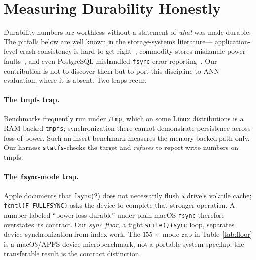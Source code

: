 \documentclass[sigconf,nonacm,balance=false]{acmart}
\newcommand{\fsync}{\texttt{fsync}}
\begin{document}
\section{Measuring Durability Honestly}
\label{sec:honest}
Durability numbers are worthless without a statement of \emph{what} was made
durable. The pitfalls below are well known in the storage-systems literature---
application-level crash-consistency is hard to get right~\cite{pillai}, commodity
stores mishandle power faults~\cite{torturing}, and even PostgreSQL mishandled
\fsync{} error reporting~\cite{fsyncgate}. Our contribution is not to discover them
but to port this discipline to ANN evaluation, where it is absent. Two traps recur.

\paragraph{The tmpfs trap.} Benchmarks frequently run under \texttt{/tmp}, which
on some Linux distributions is a RAM-backed \texttt{tmpfs}; synchronization there
cannot demonstrate persistence across loss of power. Such an insert benchmark
measures the memory-backed path only. Our
harness \texttt{statfs}-checks the target and \emph{refuses} to report write
numbers on tmpfs.

\paragraph{The \fsync{}-mode trap.} Apple documents that \texttt{fsync}(2) does
not necessarily flush a drive's volatile cache; \texttt{fcntl(F\_FULLFSYNC)} asks
the device to complete that stronger operation. A number labeled
``power-loss durable'' under plain macOS \fsync{} therefore overstates its
contract. Our \emph{sync floor}, a tight \texttt{write()+sync} loop, separates
device synchronization from index work. The $155\times$ mode gap in
Table~\ref{tab:floor} is a macOS/APFS device microbenchmark, not a portable system
speedup; the transferable result is the contract distinction.
\end{document}
